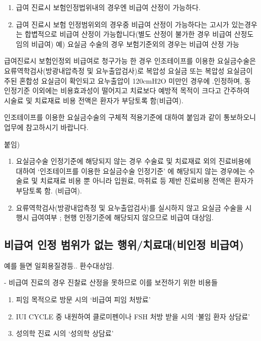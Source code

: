 \par
\medskip
\begin{enumerate}[①]\tightlist
\item 급여 진료시 보험인정법위내의 경우엔 비급여 산정이 가능하다.
\item 급여 진료시 보험 인정범위외의 경우중 비급여 산정이 가능하다는 고시가 있는경우는 합볍적으로 비급여 산정이 가능합니다(별도 산정이 불가한 경우 비급여 산정도 임의 비급여) 예) 요실금 수술의 경우 보험기준외의 경우는 비급여  산정 가능
\end{enumerate}

\begin{commentbox}{급여진료시 보험인정외 비급여로 청구가능 한 경우}
인조테이프를 이용한 요실금수술은 요류역학검사(방광내압측정 및 요누출압검사)로 복압성 요실금 또는 복압성 요실금이 주된 혼합성 요실금이 확인되고 요누출압이 120cmH2O 미만인 경우에 .인정하며, 동 인정기준 이외에는 비용효과성이 떨어지고 치료보다 예방적 목적이 크다고 간주하여 시술료 및 치료재료 비용 전액은 환자가 부담토록 함(비급여).\par

인조테이프를 이용한 요실금수술의 구체적 적용기준에 대하여 붙임과 같이 통보하오니 업무에 참고하시기 바랍니다.\par
 
붙임)
\begin{enumerate}[1.]\tightlist
\item 요실금수술 인정기준에 해당되지 않는 경우 수술료 및 치료재료 외의 진료비용에 대하여 ‘인조테이프를 이용한 요실금수술 인정기준’ 에 해당되지 않는 경우에는 수술료 및 치료재료 비용 뿐 아니라 입원료, 마취료 등 제반 진료비용 전액은 환자가 부담토록 함. (비급여).
\item 요류역학검사(방광내압측정 및 요누출압검사)를 실시하지 않고 요실금 수술을 시행시 급여여부 ; 현행 인정기준에 해당되지 않으므로 비급여 대상임.
\end{enumerate}
\end{commentbox}

\subsection{비급여 인정 범위가 없는 행위/치료대(비인정 비급여)}
예를 들면 일회용질경등.. 환수대상임.\par
- 비급여 진료의 경우 진찰료 산정을 못하므로 이를 보전하기 위한 비용들
\begin{enumerate}[①]\tightlist
\item 피임 목적으로 방문 시의 ‘비급여 피임 처방료’ 
\item IUI CYCLE 중 내원하여 클로미펜이나 FSH 처방 받을 시의 ‘불임 환자 상담료’
\item 성의학 진료 시의 ‘성의학 상담료’
\end{enumerate}

